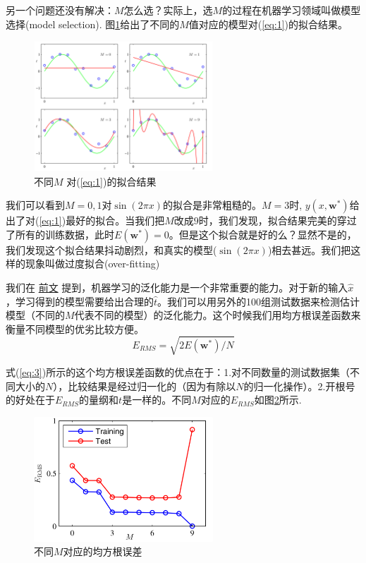 \documentclass[10pt,a4paper,UTF8]{article}
\begin{document}
另一个问题还没有解决：\(M\)怎么选？实际上，选\(M\)的过程在机器学习领域叫做模型选择(model selection). 图\ref{fig:org8d84aa6}给出了不同的\(M\)值对应的模型对(\ref{eq:1})的拟合结果。
\begin{figure}[htbp]
\centering
\includegraphics[width=0.6\textwidth]{../../img/computer_prml/20170430figure1dot4.png}
\caption{\label{fig:org8d84aa6}
不同\(M\) 对(\ref{eq:1})的拟合结果}
\end{figure}

我们可以看到\(M=0,1\)对\(\sin(2\pi x)\)的拟合是非常粗糙的。\(M=3\)时, \(y(x, \mathbf{w}^{*})\)给出了对(\ref{eq:1})最好的拟合。当我们把\(M\)改成\(9\)时，我们发现，拟合结果完美的穿过了所有的训练数据，此时\(E( \mathbf{w}^{*}) = 0\)。但是这个拟合就是好的么？显然不是的，我们发现这个拟合结果抖动剧烈，和真实的模型(\(\sin(2\pi x)\))相去甚远。我们把这样的现象叫做过度拟合(over-fitting)

我们在 \href{first-impression-pattern-recognition.org}{前文} 提到，机器学习的泛化能力是一个非常重要的能力。对于新的输入\(\hat{x}\)，学习得到的模型需要给出合理的\(\hat{t}\)。我们可以用另外的100组测试数据来检测估计模型（不同的\(M\)代表不同的模型）的泛化能力。这个时候我们用均方根误差函数来衡量不同模型的优劣比较方便。
\begin{equation}
\label{eq:3}
E_{RMS} = \sqrt{2E( \mathbf{w}^{*})/N}
\end{equation}

式(\ref{eq:3})所示的这个均方根误差函数的优点在于：1.对不同数量的测试数据集（不同大小的\(N\)），比较结果是经过归一化的（因为有除以\(N\)的归一化操作）。2.开根号的好处在于\(E_{RMS}\)的量纲和\(t\)是一样的。不同\(M\)对应的\(E_{RMS}\)如图\ref{fig:orgb25799e}所示.
\begin{figure}[htbp]
\centering
\includegraphics[width=0.6\textwidth]{../../img/computer_prml/20170430figure1dot5.png}
\caption{\label{fig:orgb25799e}
不同\(M\)对应的均方根误差}
\end{figure}
\end{document}
